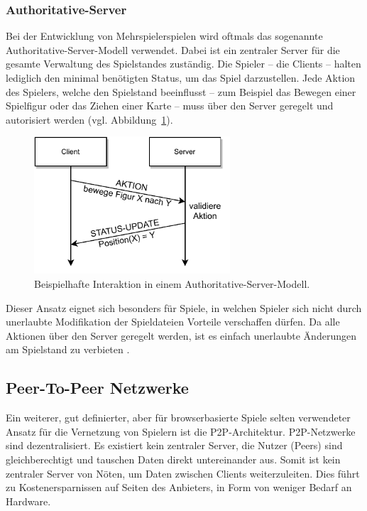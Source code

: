\subsubsection{Authoritative-Server}
Bei der Entwicklung von Mehrspielerspielen wird oftmals das sogenannte \glqq{}Authoritative-Server\grqq{}-Modell verwendet. Dabei ist ein zentraler Server für die gesamte Verwaltung des Spielstandes zuständig. Die Spieler -- die Clients -- halten lediglich den minimal benötigten Status, um das Spiel darzustellen. Jede Aktion des Spielers, welche den Spielstand beeinflusst -- zum Beispiel das Bewegen einer Spielfigur oder das Ziehen einer Karte -- muss über den Server geregelt und autorisiert werden \cite{authservermodel} (vgl. Abbildung~\ref{figure:authserver}).\par

\begin{figure}[h]
\centering
\includegraphics[width=0.65\textwidth]{bilder/PDF_SVG/AUTH_SERVER.pdf}
\caption{Beispielhafte Interaktion in einem Authoritative-Server-Modell.}
\label{figure:authserver}
\end{figure}

Dieser Ansatz eignet sich besonders für Spiele, in welchen Spieler sich nicht durch unerlaubte Modifikation der Spieldateien Vorteile verschaffen dürfen. Da alle Aktionen über den Server geregelt werden, ist es einfach unerlaubte Änderungen am Spielstand zu verbieten \cite{authservermodel}.\par

\subsection{Peer-To-Peer Netzwerke}
Ein weiterer, gut definierter, aber für browserbasierte Spiele selten verwendeter Ansatz für die Vernetzung von Spielern ist die \acf{P2P}-Architektur. \acs{P2P}-Netzwerke sind dezentralisiert. Es existiert kein zentraler Server, die Nutzer (Peers) sind gleichberechtigt und tauschen Daten direkt untereinander aus. Somit ist kein zentraler Server von Nöten, um Daten zwischen Clients weiterzuleiten. Dies führt zu Kostenersparnissen auf Seiten des Anbieters, in Form von weniger Bedarf an Hardware.\par


